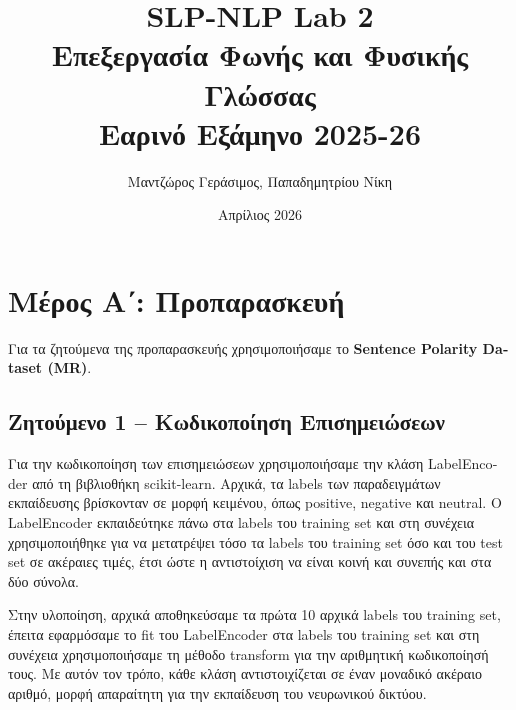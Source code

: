 \documentclass[11pt,a4paper]{article}
\title{
  \textbf{\foreignlanguage{english}{SLP-NLP Lab 2}}\\[0.5em]
  \large Επεξεργασία Φωνής και Φυσικής Γλώσσας\\
  Εαρινό Εξάμηνο 2025-26
}
\author{Μαντζώρος Γεράσιμος, Παπαδημητρίου Νίκη}
\date{Απρίλιος 2026}
\begin{document}

\maketitle
\tableofcontents
\newpage

\section*{Μέρος Α΄: Προπαρασκευή}

Για τα ζητούμενα της προπαρασκευής χρησιμοποιήσαμε το \textbf{\textlatin{Sentence Polarity Dataset (MR)}}.

\subsection*{Ζητούμενο 1 -- Κωδικοποίηση Επισημειώσεων}

Για την κωδικοποίηση των επισημειώσεων χρησιμοποιήσαμε την κλάση \textlatin{LabelEncoder} από τη βιβλιοθήκη \textlatin{scikit-learn}. 
Αρχικά, τα \textlatin{labels} των παραδειγμάτων εκπαίδευσης βρίσκονταν σε μορφή κειμένου, όπως \textlatin{positive}, \textlatin{negative} 
και \textlatin{neutral}. Ο \textlatin{LabelEncoder} εκπαιδεύτηκε πάνω στα \textlatin{labels} του \textlatin{training set} και στη συνέχεια 
χρησιμοποιήθηκε για να μετατρέψει τόσο τα \textlatin{labels} του \textlatin{training set} όσο και του \textlatin{test set} σε ακέραιες τιμές, 
έτσι ώστε η αντιστοίχιση να είναι κοινή και συνεπής και στα δύο σύνολα.

Στην υλοποίηση, αρχικά αποθηκεύσαμε τα πρώτα 10 αρχικά \textlatin{labels} του \textlatin{training set}, έπειτα εφαρμόσαμε 
το \textlatin{fit} του \textlatin{LabelEncoder} στα \textlatin{labels} του \textlatin{training set} και στη συνέχεια χρησιμοποιήσαμε τη 
μέθοδο \textlatin{transform} για την αριθμητική κωδικοποίησή τους. Με αυτόν τον τρόπο, κάθε κλάση αντιστοιχίζεται σε έναν μοναδικό ακέραιο αριθμό, 
μορφή απαραίτητη για την εκπαίδευση του νευρωνικού δικτύου.
\end{document}
